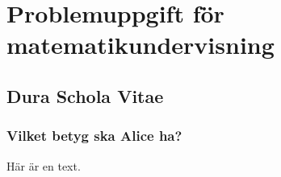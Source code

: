 \part*{Problemuppgift för matematikundervisning}

\chapter*{Dura Schola Vitae}

\setcounter{section}{0}
\section{Vilket betyg ska Alice ha?}
Här är en text.